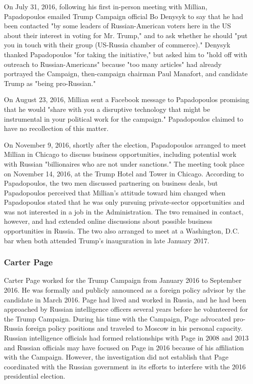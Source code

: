 On July 31, 2016, following his first in-person meeting with Millian, Papadopoulos emailed Trump Campaign official Bo Denysyk to say that he had been contacted "by some leaders of Russian-American voters here in the US about their interest in voting for Mr. Trump," and to ask whether he should "put you in touch with their group (US-Russia chamber of commerce)."%
Denysyk thanked Papadopoulos "for taking the initiative," but asked him to "hold off with outreach to Russian-Americans" because "too many articles" had already portrayed the Campaign, then-campaign chairman Paul Manafort, and candidate Trump as "being pro-Russian."%

On August 23, 2016, Millian sent a Facebook message to Papadopoulos promising that he would "share with you a disruptive technology that might be instrumental in your political work for the campaign."%
Papadopoulos claimed to have no recollection of this matter.%

On November 9, 2016, shortly after the election, Papadopoulos arranged to meet Millian in Chicago to discuss business opportunities, including potential work with Russian "billionaires who are not under sanctions."%
The meeting took place on November 14, 2016, at the Trump Hotel and Tower in Chicago.%
According to Papadopoulos, the two men discussed partnering on business deals, but Papadopoulos perceived that Millian's attitude toward him changed when Papadopoulos stated that he was only pursuing private-sector opportunities and was not interested in a job in the Administration.%
The two remained in contact, however, and had extended online discussions about possible business opportunities in Russia.%
The two also arranged to meet at a Washington, D.C. bar when both attended Trump's inauguration in late January 2017.%

\subsubsection{Carter Page}

Carter Page worked for the Trump Campaign from January 2016 to September 2016.
He was formally and publicly announced as a foreign policy advisor by the candidate in March 2016.%
Page had lived and worked in Russia, and he had been approached by Russian intelligence officers several years before he volunteered for the Trump Campaign.
During his time with the Campaign, Page advocated pro-Russia foreign policy positions and traveled to Moscow in his personal capacity.
Russian intelligence officials had formed relationships with Page in 2008 and 2013 and Russian officials may have focused on Page in 2016 because of his affiliation with the Campaign.
However, the investigation did not establish that Page coordinated with the Russian government in its efforts to interfere with the 2016 presidential election.

